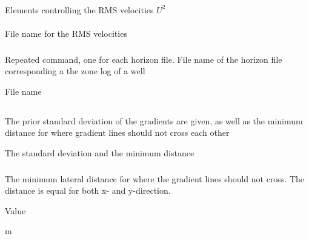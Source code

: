 \subsubsection{}
 \slist
   \item \Description Elements controlling the RMS velocities $U^2$
   \item \Argument 
   \item \Default 
 \elist

\paragraph{}
 \slist
   \item \Description File name for the RMS velocities
   \item \Argument
   \item \Default
 \elist

\subsubsection{}
 \slist
   \item \Description Repeated command, one for each horizon file. File name of the horizon file corresponding a the zone log of a well
   \item \Argument File name
   \item \Default 
 \elist

\subsection{}
 \slist
   \item \Description The prior standard deviation of the gradients are given, as well as the minimum distance for where gradient lines should not cross each other
   \item \Argument The standard deviation and the minimum distance
   \item \Default
 \elist

\subsubsection{}
 \slist
   \item \Description The minimum lateral distance for where the gradient lines should not cross. The distance is equal for both x- and y-direction.
   \item \Argument Value
   \item {} m
 \elist

